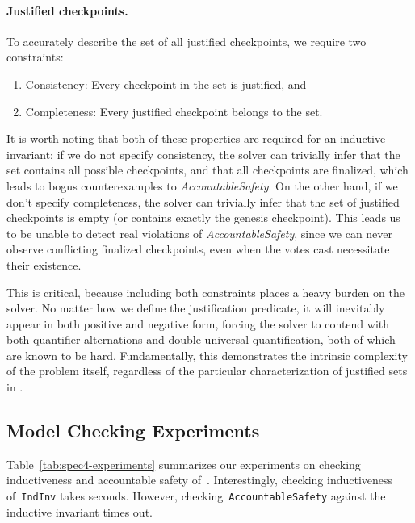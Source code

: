 \paragraph{Justified checkpoints.} To accurately describe the set of all justified checkpoints, we require two constraints:
\begin{enumerate}
	\item Consistency: Every checkpoint in the set is justified, and 
	\item Completeness: Every justified checkpoint belongs to the set.
\end{enumerate}
It is worth noting that both of these properties are required for an inductive invariant; if we do not specify consistency, the solver can trivially infer that the set contains all possible checkpoints, and that all checkpoints are finalized, which leads to bogus counterexamples to \textit{AccountableSafety}.
On the other hand, if we don't specify completeness, the solver can trivially infer that the set of justified checkpoints is empty (or contains exactly the genesis checkpoint). This leads us to be unable to detect real violations of \textit{AccountableSafety}, since we can never observe conflicting finalized checkpoints, even when the votes cast necessitate their existence.

This is critical, because including both constraints places a heavy burden on the solver. No matter how we define the justification predicate, it will inevitably appear in both positive and negative form, forcing the solver to contend with both quantifier alternations and double universal quantification, both of which are known to be hard.
Fundamentally, this demonstrates the intrinsic complexity of the problem itself, regardless of the particular characterization of justified sets in \tlap{}.

\subsection{Model Checking Experiments}

Table~\ref{tab:spec4-experiments} summarizes our experiments on checking
inductiveness and accountable safety of~\SpecFourB{}. Interestingly, checking
inductiveness of~\texttt{IndInv} takes seconds. However,
checking~\texttt{AccountableSafety} against the inductive invariant times out.

